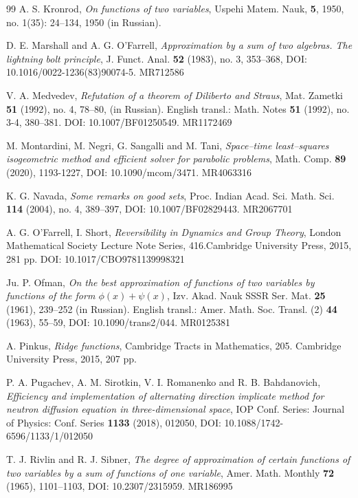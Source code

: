\documentclass[12p]{article}
\numberwithin{equation}{section}
\begin{document}
\begin{thebibliography}{99}
A. S. Kronrod, {\it On functions of two variables}, Uspehi Matem. Nauk, {\bf 5}, 1950, no. 1(35): 24–134, 1950  (in Russian).

 D. E. Marshall and A. G. O’Farrell, {\it Approximation by a sum of two algebras. The lightning bolt principle}, J. Funct. Anal. {\bf 52} (1983), no. 3, 353–368, DOI: 10.1016/0022-1236(83)90074-5. MR712586

 V. A. Medvedev, {\it Refutation of a theorem of Diliberto and Straus}, Mat. Zametki {\bf 51} (1992), no. 4, 78–80, (in Russian). English transl.: Math. Notes {\bf 51} (1992), no. 3-4, 380–381. DOI: 10.1007/BF01250549. MR1172469

M. Montardini, M. Negri, G. Sangalli and M. Tani, {\it Space–time least–squares isogeometric method and efficient solver for parabolic problems}, Math. Comp. {\bf 89} (2020), 1193-1227, DOI: 10.1090/mcom/3471. MR4063316
 
 K. G. Navada, {\it Some remarks on good sets}, Proc. Indian Acad. Sci. Math. Sci. {\bf 114} (2004), no. 4, 389–397, DOI: 10.1007/BF02829443. MR2067701

A. G. O’Farrell, I. Short, {\it Reversibility in Dynamics and Group Theory}, London Mathematical Society Lecture Note Series, 416.Cambridge University Press, 2015, 281 pp. DOI:
10.1017/CBO9781139998321

Ju. P. Ofman, {\it On the best approximation of functions of two variables by functions of the form $\phi(x)+\psi(x)$}, Izv. Akad. Nauk SSSR Ser. Mat. {\bf 25} (1961), 239–252 (in Russian). English transl.: Amer. Math. Soc. Transl. (2) {\bf 44} (1963), 55–59, DOI: 10.1090/trans2/044. MR0125381 

A. Pinkus, {\it Ridge functions}, Cambridge Tracts in Mathematics, 205. Cambridge University Press, 2015, 207 pp.

P. A. Pugachev, A. M. Sirotkin, V. I. Romanenko and R. B. Bahdanovich, {\it Efficiency and implementation of alternating direction implicate method for neutron diffusion equation in three-dimensional space}, IOP Conf. Series: Journal of Physics: Conf. Series {\bf 1133} (2018), 012050, DOI: 10.1088/1742-6596/1133/1/012050


T. J. Rivlin and R. J. Sibner, {\it The degree of approximation of certain functions of two variables by a sum of functions of one variable}, Amer. Math. Monthly {\bf 72} (1965), 1101–1103, DOI: 10.2307/2315959. MR186995


\end{thebibliography}
\end{document}
